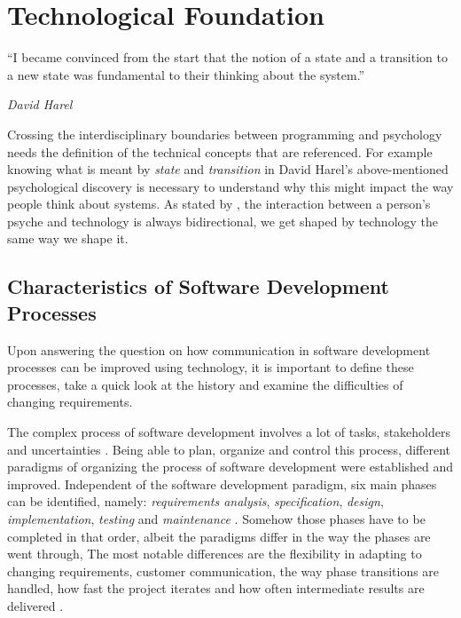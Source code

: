 \chapter{Technological Foundation}
\label{chap:technological-foundation}
\epigraph{``I became convinced from the start that the notion of a state and a transition to a new state was fundamental to their thinking about the system.''}{\textit{David Harel}}
\noindent
Crossing the interdisciplinary boundaries between programming and psychology needs the definition of the technical concepts that are referenced.
For example knowing what is meant by \emph{state} and \emph{transition} in David Harel's above-mentioned psychological discovery is necessary to understand why this might impact the way people think about systems. 
As stated by \textcite{schraube_ich_2012}, the interaction between a person's psyche and technology is always bidirectional, we get shaped by technology the same way we shape it.

\section{Characteristics of Software Development Processes}
\label{sec:characteristics-of-software-development-processes}
Upon answering the question on how communication in software development processes can be improved using technology, it is important to define these processes, take a quick look at the history and examine the difficulties of changing requirements.

The complex process of software development involves a lot of tasks, stakeholders and uncertainties \autocite{mayr_projekt_2005}.
Being able to plan, organize and control this process, different paradigms of organizing the process of software development were established and improved.
Independent of the software development paradigm, six main phases can be identified, namely: \emph{requirements analysis}, \emph{specification}, \emph{design}, \emph{implementation}, \emph{testing} and \emph{maintenance} \autocite{harel_statecharts:_1987}.
Somehow those phases have to be completed in that order, albeit the paradigms differ in the way the phases are went through, 
The most notable differences are the flexibility in adapting to changing requirements, customer communication, the way phase transitions are handled, how fast the project iterates and how often intermediate results are delivered \autocite{mayr_projekt_2005}.

